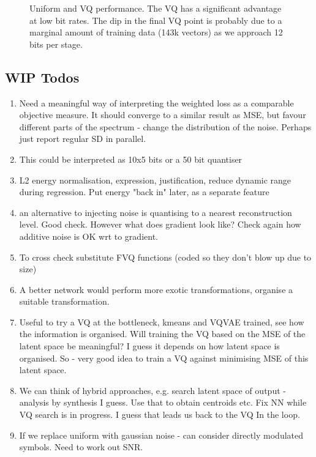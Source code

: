 \documentclass{article}
\begin{document}
\begin{figure}
\caption{Uniform and VQ performance.  The VQ has a significant advantage at low bit rates. The dip in the final VQ point is probably due to a marginal amount of training data (143k vectors) as we approach 12 bits per stage.}
\label{fig:uniform_vq}
\begin{center}

\end{center}
\end{figure}

\subsection {WIP Todos}

\begin{enumerate}
\item Need a meaningful way of interpreting the weighted loss as a comparable objective measure.  It should converge to a similar result as MSE, but favour different parts of the spectrum - change the distribution of the noise. Perhaps just report regular SD in parallel.
\item This could be interpreted as 10x5 bits or a 50 bit quantiser
\item L2 energy normalisation, expression, justification, reduce dynamic range during regression. Put energy "back in" later, as a separate feature
\item an alternative to injecting noise is quantising to a nearest reconstruction level.  Good check.  However what does gradient look like?  Check again how additive noise is OK wrt to gradient. 
\item To cross check substitute FVQ functions (coded so they don't blow up due to size)
\item A better network would perform more exotic transformations, organise a suitable transformation.
\item Useful to try a VQ at the bottleneck, kmeans and VQVAE trained, see how the information is organised.  Will training the VQ based on the MSE of the latent space be meaningful?  I guess it depends on how latent space is organised.  So - very good idea to train a VQ against minimising MSE of this latent space.
\item We can think of hybrid approaches, e.g. search latent space of output - analysis by synthesis I guess.  Use that to obtain centroids etc.  Fix NN while VQ search is in progress.  I guess that leads us back to the VQ In the loop.
\item If we replace uniform with gaussian noise - can consider directly modulated symbols.  Need to work out SNR.
\end{enumerate}
\end{document}

